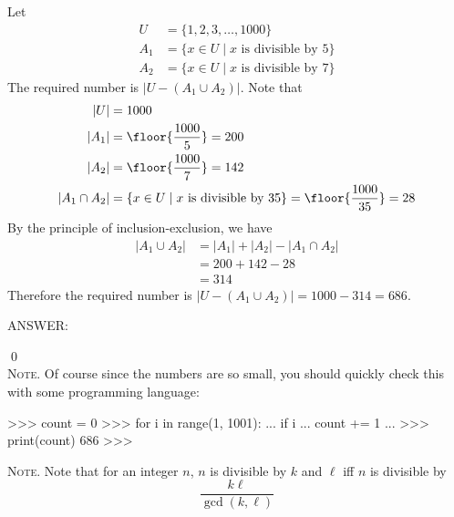 Let 
\begin{align*}
U &= \{ 1, 2, 3, \ldots, 1000 \} \\
A_1 &= \{x \in U \mid x \text{ is divisible by 5} \} \\
A_2 &= \{x \in U \mid x \text{ is divisible by 7} \}
\end{align*}
The required number is $|U - (A_1 \cup A_2)|$.
Note that 
\begin{align*}
|U| &= 1000 \\
|A_1| &= \floor{ \frac{1000}{5} } = 200\\
|A_2| &= \floor{ \frac{1000}{7} } = 142\\
|A_1 \cap A_2| &= \{x \in U \mid x \text{ is divisible by 35} \} = \floor{ \frac{1000}{35} } = 28 
\end{align*}
By the principle of inclusion-exclusion, we have
\begin{align*}
|A_1 \cup A_2| 
&= |A_1| + |A_2| - |A_1 \cap A_2| \\
&= 200 + 142 - 28 \\
&= 314
\end{align*}
Therefore the required number is $|U - (A_1 \cup A_2)| = 1000 - 314 
= 686$.

ANSWER:

\qed
\\

\textsc{Note.}
Of course since the numbers are so small, you should quickly
check this with some programming language:
\begin{console}[fontsize=\footnotesize]
>>> count = 0
>>> for i in range(1, 1001):
...     if i %
...         count += 1
... 
>>> print(count)
686
>>> 
\end{console}

\textsc{Note.}
Note that for an integer $n$, $n$ is divisible by $k$ and $\ell$
iff $n$ is divisible by 
\[
\frac{k \ell}{\gcd(k, \ell)}
\]
